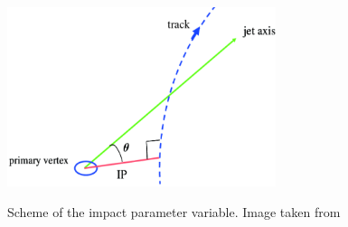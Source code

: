  \begin{figure}[h] 
 \centering
 \caption{Scheme of the impact parameter variable. Image taken from \cite{Impact_parameter_image}}
 \includegraphics[width=0.7\textwidth]{./Capitulos/VariableDefinitions/impactParameter}  
 \label{Impact_parameter}
 \end{figure} 

 
 
 
 
 
 
 
 
 
 
 
 
 
 
 
 
 
 
 